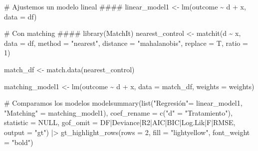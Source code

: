\documentclass[
  letterpaper,
  DIV=11,
  numbers=noendperiod,
  oneside]{scrreprt}
\newenvironment{Shaded}{\begin{snugshade}}{\end{snugshade}}
\newcommand{\AttributeTok}[1]{\textcolor[rgb]{0.40,0.45,0.13}{#1}}
\newcommand{\CommentTok}[1]{\textcolor[rgb]{0.37,0.37,0.37}{#1}}
\newcommand{\ConstantTok}[1]{\textcolor[rgb]{0.56,0.35,0.01}{#1}}
\newcommand{\DecValTok}[1]{\textcolor[rgb]{0.68,0.00,0.00}{#1}}
\newcommand{\FunctionTok}[1]{\textcolor[rgb]{0.28,0.35,0.67}{#1}}
\newcommand{\NormalTok}[1]{\textcolor[rgb]{0.00,0.23,0.31}{#1}}
\newcommand{\OtherTok}[1]{\textcolor[rgb]{0.00,0.23,0.31}{#1}}
\newcommand{\SpecialCharTok}[1]{\textcolor[rgb]{0.37,0.37,0.37}{#1}}
\newcommand{\StringTok}[1]{\textcolor[rgb]{0.13,0.47,0.30}{#1}}
\begin{document}
\begin{Shaded}
\begin{Highlighting}[]
\CommentTok{\# Ajustemos un modelo lineal \#\#\#\#}
\NormalTok{linear\_model1 }\OtherTok{\textless{}{-}} \FunctionTok{lm}\NormalTok{(outcome }\SpecialCharTok{\textasciitilde{}}\NormalTok{ d }\SpecialCharTok{+}\NormalTok{ x, }\AttributeTok{data =}\NormalTok{ df)}

\CommentTok{\# Con matching \#\#\#\#}
\FunctionTok{library}\NormalTok{(MatchIt)}
\NormalTok{nearest\_control }\OtherTok{\textless{}{-}} \FunctionTok{matchit}\NormalTok{(d }\SpecialCharTok{\textasciitilde{}}\NormalTok{ x, }
                           \AttributeTok{data =}\NormalTok{ df,}
                           \AttributeTok{method =} \StringTok{"nearest"}\NormalTok{, }
                           \AttributeTok{distance =} \StringTok{"mahalanobis"}\NormalTok{,}
                           \AttributeTok{replace =}\NormalTok{ T,}
                           \AttributeTok{ratio =} \DecValTok{1}\NormalTok{)}

\NormalTok{match\_df }\OtherTok{\textless{}{-}} \FunctionTok{match.data}\NormalTok{(nearest\_control)}

\NormalTok{matching\_model1 }\OtherTok{\textless{}{-}} \FunctionTok{lm}\NormalTok{(outcome }\SpecialCharTok{\textasciitilde{}}\NormalTok{ d }\SpecialCharTok{+}\NormalTok{ x, }
                      \AttributeTok{data =}\NormalTok{ match\_df, }
                      \AttributeTok{weights =}\NormalTok{ weights)}

\CommentTok{\# Comparamos los modelos}
\FunctionTok{modelsummary}\NormalTok{(}\FunctionTok{list}\NormalTok{(}\StringTok{"Regresión"}\OtherTok{=}\NormalTok{ linear\_model1,}
                  \StringTok{"Matching"} \OtherTok{=}\NormalTok{ matching\_model1),}
             \AttributeTok{coef\_rename =} \FunctionTok{c}\NormalTok{(}\StringTok{"d"} \OtherTok{=} \StringTok{"Tratamiento"}\NormalTok{),}
             \AttributeTok{statistic =} \ConstantTok{NULL}\NormalTok{, }
               \AttributeTok{gof\_omit =} \StringTok{\textquotesingle{}DF|Deviance|R2|AIC|BIC|Log.Lik|F|RMSE\textquotesingle{}}\NormalTok{,}
             \AttributeTok{output =} \StringTok{"gt"}\NormalTok{) }\SpecialCharTok{|\textgreater{}}
  \FunctionTok{gt\_highlight\_rows}\NormalTok{(}\AttributeTok{rows =} \DecValTok{2}\NormalTok{, }
                    \AttributeTok{fill =} \StringTok{"lightyellow"}\NormalTok{,}
                    \AttributeTok{font\_weight =} \StringTok{"bold"}\NormalTok{)}
\end{Highlighting}
\end{Shaded}
\end{document}
